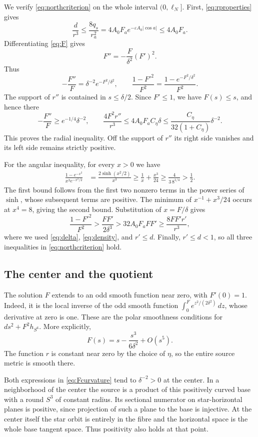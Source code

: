 \documentclass[12pt]{amsart}
\numberwithin{equation}{section}
\theoremstyle{remark}
\newcommand{\eps}{\varepsilon}
\begin{document}
We verify \eqref{eq:northcriterion} on the whole interval
\((0,\ell_N]\). First, \eqref{eq:rproperties} gives
\begin{equation}\label{eq:density}
\frac d{r^3}\le\frac{8q_s}{r_a^2}
       =4A_0F_a e^{-\eps A_0|\cos a|}\le4A_0F_a.
\end{equation}
Differentiating \eqref{eq:F} gives
\[
F''=-\frac F{\delta^2}(F')^2.
\]
Thus
\begin{equation}\label{eq:Fcurvature}
-\frac{F''}{F}=\delta^{-2}e^{-F^2/\delta^2},\qquad
\frac{1-F'^2}{F^2}=\frac{1-e^{-F^2/\delta^2}}{F^2}.
\end{equation}
The support of \(r''\) is contained in \(s\le\delta/2\).
Since \(F'\le1\), we have \(F(s)\le s\), and hence there
\[
-\frac{F''}{F}\ge e^{-1/4}\delta^{-2},
\qquad
\frac{4F^2r''}{r^3}\le4A_0F_aC_\eta\delta
 \le\frac{C_\eta}{32(1+C_\eta)}\delta^{-2}.
\]
This proves the radial inequality. Off the support of \(r''\)
its right side vanishes and its left side remains strictly positive.

For the angular inequality, for every \(x>0\) we have
\begin{align}
\frac{1-e^{-x^2}}{x^3e^{-x^2/2}}
 &=\frac{2\sinh(x^2/2)}{x^3}
 \ge\frac1x+\frac{x^3}{24}
 \ge\frac4{3\,8^{1/4}}>\frac12.
\label{eq:elementary}
\end{align}
The first bound follows from the first two nonzero terms in the
power series of \(\sinh\), whose subsequent terms are positive.
The minimum of \(x^{-1}+x^3/24\) occurs at \(x^4=8\), giving
the second bound. Substitution of \(x=F/\delta\) gives
\[
\frac{1-F'^2}{F^2}>
       \frac{FF'}{2\delta^3}>
       32A_0F_aFF'\ge\frac{8FF'r'}{r^3},
\]
where we used \eqref{eq:delta}, \eqref{eq:density}, and \(r'\le d\).
Finally, \(r'\le d<1\), so all three inequalities in
\eqref{eq:northcriterion} hold.

\subsection{The center and the quotient}
The solution \(F\) extends to an odd smooth function near zero,
with \(F'(0)=1\). Indeed, it is the local inverse of the odd smooth function \(\int_0^F e^{z^2/(2\delta^2)}\,dz\), whose
derivative at zero is one. These are the polar smoothness conditions
for \(ds^2+F^2h_{S^6}\). More explicitly,
\[
 F(s)=s-\frac{s^3}{6\delta^2}+O(s^5).
\]
The function \(r\) is constant near zero
by the choice of \(\eta\), so the entire source metric is smooth
there.

Both expressions in \eqref{eq:Fcurvature} tend to
\(\delta^{-2}>0\) at the center. In a neighborhood of the center
the source is a product of this positively curved base with a
round \(S^3\) of constant radius. Its sectional numerator on
star-horizontal planes is positive, since projection of such a
plane to the base is injective. At the center itself the star orbit
is entirely in the fibre and the horizontal space is the whole
base tangent space. Thus positivity also holds at that point.
\end{document}
